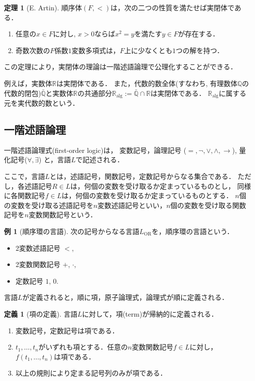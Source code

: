 \documentclass[uplatex, dvipdfmx]{jsarticle}
\newcommand{\R}{\mathbb{R}}
\newcommand{\Q}{\mathbb{Q}}
\newcommand{\Ralg}{\mathbb{R}_\mathrm{alg}}
\theoremstyle{definition}
\newtheorem{definition}{定義}[section]
\newtheorem{theorem}{定理}[section]
\newtheorem{example}{例}[section]
\begin{document}
\begin{theorem}[E. Artin]
     順序体$(F,<)$は，次の二つの性質を満たせば実閉体である．
     \begin{enumerate}
          \item 任意の$x \in F$に対し, $x>0$ならば$x^2 = y$を満たす$y \in F$が存在する．
          \item 奇数次数の$F$係数$1$変数多項式は，$F$上に少なくとも$1$つの解を持つ．
     \end{enumerate}
\end{theorem}

この定理により，実閉体の理論は一階述語論理で公理化することができる．

例えば，実数体$\R$は実閉体である．
また，代数的数全体(すなわち, 有理数体$\Q$の代数的閉包)$\bar{\Q}$と実数体$\R$の共通部分$\Ralg := \bar{\Q} \cap \R$は実閉体である．
$\Ralg$に属する元を実代数的数という．

\subsection{一階述語論理}
一階述語論理式(first-order logic)は，
変数記号，論理記号 ($=, \lnot, \lor, \land, \rightarrow$), 量化記号($\forall, \exists$)
と，言語$L$で記述される．

ここで，言語$L$とは，述語記号，関数記号，定数記号からなる集合である．
ただし，各述語記号$R \in L$は，何個の変数を受け取るか定まっているものとし，
同様に各関数記号$f \in L$は，何個の変数を受け取るか定まっているものとする．
$n$個の変数を受け取る述語記号を$n$変数述語記号といい，$n$個の変数を受け取る関数記号を$n$変数関数記号という．

\begin{example}[順序環の言語]
     次の記号からなる言語$L_\mathrm{OR}$を，順序環の言語という．
     \begin{itemize}
          \item 2変数述語記号 $<$,
          \item 2変数関数記号 $+$, $\cdot$,
          \item 定数記号 $1$, $0$.
     \end{itemize}
\end{example}

言語$L$が定義されると，順に項，原子論理式，論理式が順に定義される．

\begin{definition}[項の定義]
     言語$L$に対して，項(term)が帰納的に定義される．
     \begin{enumerate}
          \item 変数記号，定数記号は項である．
          \item $t_1, \dots, t_n$がいずれも項とする．任意の$n$変数関数記号$f \in L$に対し，$f(t_1, \dots, t_n)$は項である．
          \item 以上の規則により定まる記号列のみが項である．
     \end{enumerate}
\end{definition}
\end{document}
